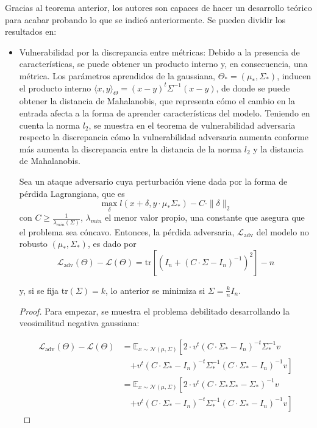 Gracias al teorema anterior, los autores son capaces de hacer un desarrollo teórico para acabar probando lo que se indicó anteriormente. Se pueden dividir los resultados en:

\begin{itemize}
	\item Vulnerabilidad por la discrepancia entre métricas: Debido a la presencia de características, se puede obtener un producto interno y, en consecuencia, una métrica. Los parámetros aprendidos de la gaussiana, $\Theta_* = (\mu_*,\Sigma_*)$, inducen el producto interno $\langle x,y \rangle_{\Theta} = (x-y)^{t} \Sigma^{-1} (x-y)$, de donde se puede obtener la distancia de Mahalanobis, que representa cómo el cambio en la entrada afecta a la forma de aprender características del modelo. Teniendo en cuenta la norma $l_2$, se muestra en el teorema de vulnerabilidad adversaria respecto la discrepancia cómo la vulnerabilidad adversaria aumenta conforme más aumenta la discrepancia entre la distancia de la norma $l_2$ y la distancia de Mahalanobis.
\begin{teorema}
Sea un ataque adversario cuya perturbación viene dada por la forma de pérdida Lagrangiana, que es 
$$\max_{\delta} l(x+\delta,y \cdot \mu_* \Sigma_*) -C \cdot \|\delta \|_2$$
con $C \geq \frac{1}{\lambda_{min}(\Sigma)}$, $\lambda_{min}$ el menor valor propio, una constante que asegura que el problema sea cóncavo. Entonces, la pérdida adversaria, $\mathcal{L}_{\text{adv}}$ del modelo no robusto $(\mu_*,\Sigma_*)$, es dado por
$$\mathcal{L}_{\text{adv}}(\Theta) - \mathcal{L}(\Theta) = \text{tr} \left[ \left( I_n + (C \cdot \Sigma - I_n)^{-1} \right)^2 \right] - n$$

y, si se fija $\text{tr}(\Sigma)=k$, lo anterior se minimiza si $\Sigma = \frac{k}{n}I_n$.
\end{teorema}
\begin{proof}
Para empezar, se muestra el problema debilitado desarrollando la veosimilitud negativa gaussiana:

\begin{align*}
\mathcal{L}_{\text{adv}} (\Theta)-\mathcal{L}(\Theta) &= \mathbb{E}_{x \sim \mathcal{N}(\mu,\Sigma)} \left[ 2 \cdot v^{t} (C \cdot \Sigma_* - I_n)^{-t}\Sigma_*^{-1}v \right. \\
&\quad \left. + v^{t}(C \cdot \Sigma_* - I_n)^{-t}\Sigma_*^{-1}(C \cdot \Sigma_* - I_n)^{-1}v \right] \\
&= \mathbb{E}_{x \sim \mathcal{N}(\mu,\Sigma)} \left[ 2 \cdot v^{t} (C \cdot \Sigma_* \Sigma_*
 - \Sigma_*)^{-1}v \right. \\
&\quad \left. +v^{t}(C \cdot \Sigma_* - I_n)^{-t} \Sigma_*^{-1}(C \cdot \Sigma_* - I_n)^{-1}v \right]
\end{align*}


\end{proof}
\end{itemize}
